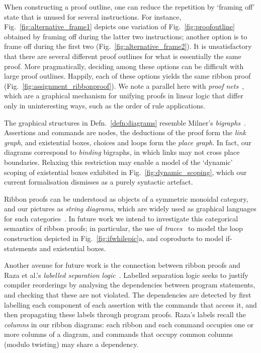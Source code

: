 \documentclass[runningheads,a4paper]{llncs}
\begin{document}
When constructing a proof outline, one can reduce the repetition by `framing off' state that is unused for several instructions. For instance, Fig.~\ref{fig:alternative_frame1} depicts one variation of Fig.~\ref{fig:proofoutline} obtained by framing off  during the latter two instructions; another option is to frame off  during the first two (Fig.~\ref{fig:alternative_frame2}). It is unsatisfactory that there are several different proof outlines for what is essentially the same proof. More pragmatically, deciding among these options can be difficult with large proof outlines. Happily, each of these options yields the same ribbon proof (Fig.~\ref{fig:assignment_ribbonproof}). We note a parallel here with \emph{proof nets}~\cite{girard87}, which are a graphical mechanism for unifying proofs in linear logic that differ only in uninteresting ways, such as the order of rule applications. 

The graphical structures in Defn.~\ref{defn:diagrams} resemble Milner's \emph{bigraphs}~\cite{milner09}. Assertions and commands are nodes, the deductions of the proof form the \emph{link graph}, and existential boxes, choices and loops form the \emph{place graph}. In fact, our diagrams correspond to \emph{binding} bigraphs, in which links may not cross place boundaries. Relaxing this restriction may enable a model of the `dynamic' scoping of existential boxes exhibited in Fig.~\ref{fig:dynamic_scoping}, which our current formalisation dismisses as a purely syntactic artefact.

Ribbon proofs can be understood as objects of a symmetric monoidal category, and our pictures as \emph{string diagrams}, which are widely used as graphical languages for such categories~\cite{selinger11}. In future work we intend to investigate this categorical semantics of ribbon proofs; in particular, the use of \emph{traces}~\cite{joyal+96} to model the loop construction depicted in Fig.~\ref{fig:ifwhilepic}a, and coproducts to model if-statements and existential boxes.

Another avenue for future work is the connection between ribbon proofs and Raza et al.'s \emph{labelled separation logic}~\cite{raza+09}. Labelled separation logic seeks to justify compiler reorderings by analysing the dependencies between program statements, and checking that these are not violated. The dependencies are detected by first labelling each component of each assertion with the commands that access it, and then propagating these labels through program proofs. Raza's labels recall the \emph{columns} in our ribbon diagrams: each ribbon and each command occupies one or more columns of a diagram, and commands that occupy common columns (modulo twisting) may share a dependency.
\end{document}
